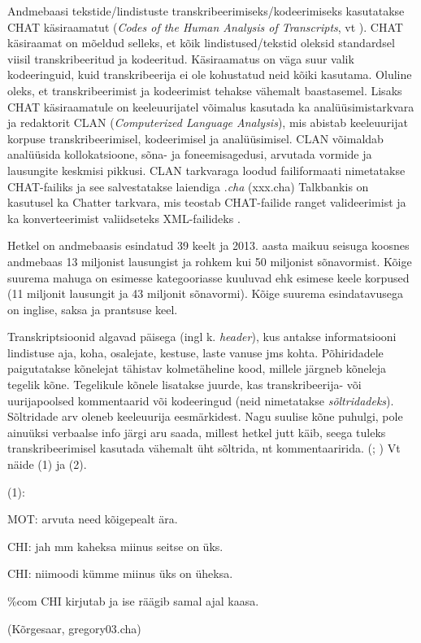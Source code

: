 \documentclass[12pt]{article}
\begin{document}
Andmebaasi tekstide/lindistuste transkribeerimiseks/kodeerimiseks kasutatakse CHAT käsiraamatut (\emph{Codes of the Human Analysis of Transcripts}, vt \citep{CHAT}). CHAT käsiraamat on mõeldud selleks, et kõik lindistused/tekstid oleksid standardsel viisil transkribeeritud ja kodeeritud. Käsiraamatus on väga suur valik kodeeringuid, kuid transkribeerija ei ole kohustatud neid kõiki kasutama. Oluline oleks, et transkribeerimist ja kodeerimist tehakse vähemalt baastasemel. Lisaks CHAT käsiraamatule on keeleuurijatel võimalus kasutada ka analüüsimistarkvara ja redaktorit CLAN (\emph{Computerized Language Analysis}), mis abistab keeleuurijat korpuse transkribeerimisel, kodeerimisel ja analüüsimisel. CLAN võimaldab analüüsida kollokatsioone, sõna- ja foneemisagedusi, arvutada vormide ja lausungite keskmisi pikkusi. CLAN tarkvaraga loodud failiformaati nimetatakse CHAT-failiks ja see salvestatakse laiendiga .\emph{cha} (xxx.cha) \citep[1--2, 6]{Gillis} Talkbankis on kasutusel ka Chatter tarkvara, mis teostab CHAT-failide ranget valideerimist ja ka konverteerimist valiidseteks XML-failideks \citep{CHATTER}.

Hetkel on andmebaasis esindatud 39 keelt ja 2013. aasta maikuu seisuga koosnes andmebaas 13 miljonist lausungist ja rohkem kui 50 miljonist sõnavormist. Kõige suurema mahuga on esimesse kategooriasse kuuluvad ehk esimese keele korpused (11 miljonit lausungit ja 43 miljonit sõnavormi). Kõige suurema esindatavusega on inglise, saksa ja prantsuse keel.\citep[2--5]{Gillis}

Transkriptsioonid algavad päisega (ingl k. \emph{header}), kus antakse informatsiooni lindistuse aja, koha, osalejate, kestuse, laste vanuse jms kohta. Põhiridadele paigutatakse kõnelejat tähistav kolmetäheline kood, millele järgneb  kõneleja tegelik kõne. Tegelikule kõnele lisatakse juurde, kas transkribeerija- või uurijapoolsed kommentaarid või kodeeringud (neid nimetatakse \emph{sõltridadeks}). Sõltridade arv oleneb keeleuurija eesmärkidest. Nagu suulise kõne puhulgi, pole ainuüksi verbaalse info järgi aru saada, millest hetkel jutt käib, seega tuleks transkribeerimisel kasutada vähemalt üht sõltrida, nt kommentaaririda. (\citealp[68]{Argus2007}; \citealp{CHAT}) Vt näide (1) ja (2).
\hfill

(1):
\begin{description}
    \item*MOT: arvuta need kõigepealt ära.
    \item*CHI: jah mm kaheksa miinus seitse on üks.
    \item*CHI: niimoodi kümme miinus üks on üheksa.
    \item\%com CHI kirjutab ja ise räägib samal ajal kaasa.
    \item(Kõrgesaar, gregory03.cha)
\end{description}
\hfill
\end{document}
